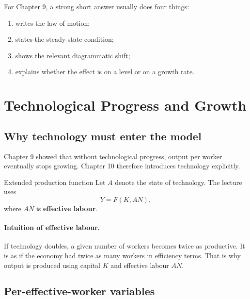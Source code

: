 \documentclass[12pt]{article}
\begin{document}
\begin{examtip}[title={Exam Focus: Standard Solow answer}]
For Chapter 9, a strong short answer usually does four things:
\begin{enumerate}[leftmargin=1.5em]
\item writes the law of motion;
\item states the steady-state condition;
\item shows the relevant diagrammatic shift;
\item explains whether the effect is on a level or on a growth rate.
\end{enumerate}
\end{examtip}

\newpage
\section{Technological Progress and Growth}

\subsection{Why technology must enter the model}

Chapter 9 showed that without technological progress, output per worker eventually stops growing. Chapter 10 therefore introduces technology explicitly.

\begin{definition}{Extended production function}{}
Let \(A\) denote the state of technology. The lecture uses
\[
Y=F(K,AN),
\]
where \(AN\) is \textbf{effective labour}.
\end{definition}

\paragraph{Intuition of effective labour.}
If technology doubles, a given number of workers becomes twice as productive. It is as if the economy had twice as many workers in efficiency terms. That is why output is produced using capital \(K\) and effective labour \(AN\).

\subsection{Per-effective-worker variables}
\end{document}
